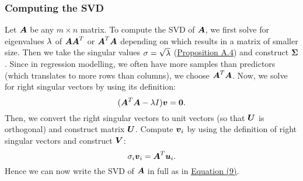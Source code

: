 \documentclass[12pt]{article}
\newcommand{\Sg}{\Sigma}
\begin{document}
	\subsubsection{Computing the SVD}
	Let $\boldsymbol{A}$ be any $m\times n$ matrix. To compute the SVD of $\boldsymbol{A}$, we first solve for eigenvalues $\lambda$ of $\boldsymbol{A}\boldsymbol{A}^T$ or $\boldsymbol{A}^T\boldsymbol{A}$ depending on which results in a matrix of smaller size. Then we take the singular values $\sigma=\sqrt{\lambda}$ (\hyperref[prop1]{Proposition A.4}) and construct $\boldsymbol{\Sg}$. Since in regression modelling, we often have more samples than predictors (which translates to more rows than columns), we choose $\boldsymbol{A}^T\boldsymbol{A}$. Now, we solve for right singular vectors by using its definition:
	\pagebreak
	\begin{equation}
		(\boldsymbol{A}^T\boldsymbol{A}-\lambda I)\boldsymbol{v}=\textbf{0}.
	\end{equation}
	Then, we convert the right singular vectors to unit vectors (so that $\boldsymbol{U}$ is orthogonal) and construct matrix $\boldsymbol{U}$. Compute $\boldsymbol{v}_i$ by using the definition of right singular vectors and construct $\boldsymbol{V}$:
	\begin{equation}
		\sigma_i\boldsymbol{v}_i=\boldsymbol{A}^T\boldsymbol{u}_i.
	\end{equation}
	Hence we can now write the SVD of $\boldsymbol{A}$ in full as in \hyperref[eqn9]{Equation (9)}.
\end{document}
